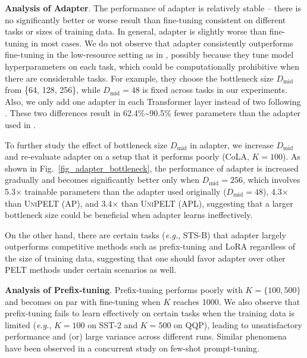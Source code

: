 {{\bf Analysis of Adapter}.} The performance of adapter is relatively stable -- there is no significantly better or worse result than fine-tuning consistent on different tasks or sizes of training data. In general, adapter is slightly worse than fine-tuning in most cases. We do not observe that adapter consistently outperforms fine-tuning in the low-resource setting as in \citet{he-etal-2021-effectiveness}, possibly because they tune model hyperparameters on each task, which could be computationally prohibitive when there are considerable tasks. For example, they choose the bottleneck size $D_{\text{mid}}$ from \{64, 128, 256\}, while $D_{\text{mid}}=48$ is fixed across tasks in our experiments. Also, we only add one adapter in each Transformer layer instead of two following \citet{pfeiffer-etal-2021-adapterfusion}.
These two differences result in 62.4\%\textasciitilde90.5\% fewer parameters than the adapter used in \citet{he-etal-2021-effectiveness}.

To further study the effect of bottleneck size $D_{\text{mid}}$ in adapter, we increase $D_{\text{mid}}$ and re-evaluate adapter on a setup that it performs poorly (CoLA, $K=100$). As shown in Fig.~\ref{fig_adapter_bottleneck}, the performance of adapter is increased gradually and becomes significantly better only when $D_{\text{mid}}=256$, which involves 5.3$\times$ trainable parameters than the adapter used originally ($D_{\text{mid}}=48$), 4.3$\times$ than \textsc{UniPELT} (AP), and 3.4$\times$ than \textsc{UniPELT} (APL), suggesting that a larger bottleneck size could be beneficial when adapter learns ineffectively. 

On the other hand, there are certain tasks (\textit{e.g.}, STS-B) that adapter largely outperforms competitive methods such as prefix-tuning and LoRA regardless of the size of training data, suggesting that one should favor adapter over other PELT methods under certain scenarios as well.

{{\bf Analysis of Prefix-tuning}.} Prefix-tuning performs poorly with $K=\{100, 500 \}$ and becomes on par with fine-tuning when $K$ reaches 1000. We also observe that prefix-tuning fails to learn effectively on certain tasks when the training data is limited (\textit{e.g.}, $K=100$ on SST-2 and $K=500$ on QQP), leading to unsatisfactory performance and (or) large variance across different runs. Similar phenomena have been observed in a concurrent study \cite{gu2021ppt} on few-shot prompt-tuning.

